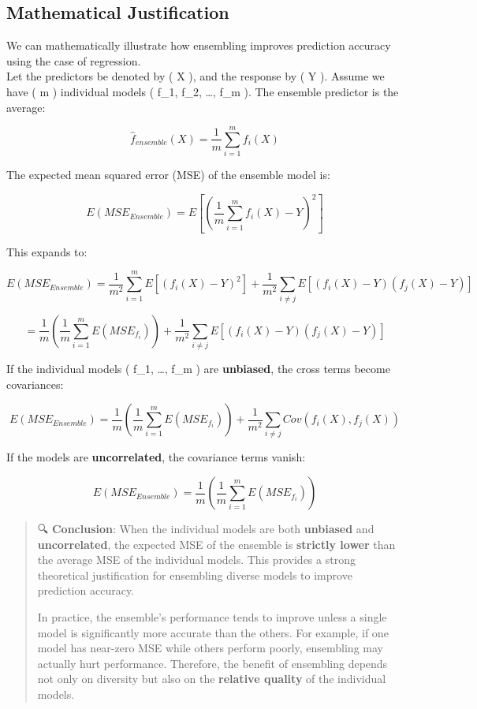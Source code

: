 \documentclass[
  letterpaper,
  DIV=11,
  numbers=noendperiod]{scrreprt}
\begin{document}
\subsection{Mathematical
Justification}\label{mathematical-justification}

We can mathematically illustrate how ensembling improves prediction
accuracy using the case of regression.\\
Let the predictors be denoted by ( X ), and the response by ( Y ).
Assume we have ( m ) individual models ( f\_1, f\_2, \dots, f\_m ). The
ensemble predictor is the average:

\[
\hat{f}_{ensemble}(X) = \frac{1}{m} \sum_{i=1}^{m} f_i(X)
\]

The expected mean squared error (MSE) of the ensemble model is:

\[
E(MSE_{Ensemble}) = E\left[\left( \frac{1}{m} \sum_{i = 1}^{m} f_i(X) - Y \right)^2 \right]
\]

This expands to:

\[
E(MSE_{Ensemble}) = \frac{1}{m^2} \sum_{i = 1}^{m} E\left[(f_i(X) - Y)^2 \right] + \frac{1}{m^2} \sum_{i \ne j} E\left[(f_i(X) - Y)(f_j(X) - Y) \right]
\]

\[
= \frac{1}{m} \left( \frac{1}{m} \sum_{i=1}^m E(MSE_{f_i}) \right) + \frac{1}{m^2} \sum_{i \ne j} E\left[(f_i(X) - Y)(f_j(X) - Y) \right]
\]

If the individual models ( f\_1, \dots, f\_m ) are \textbf{unbiased},
the cross terms become covariances:

\[
E(MSE_{Ensemble}) = \frac{1}{m} \left( \frac{1}{m} \sum_{i=1}^m E(MSE_{f_i}) \right) + \frac{1}{m^2} \sum_{i \ne j} Cov(f_i(X), f_j(X))
\]

If the models are \textbf{uncorrelated}, the covariance terms vanish:

\[
E(MSE_{Ensemble}) = \frac{1}{m} \left( \frac{1}{m} \sum_{i=1}^m E(MSE_{f_i}) \right)
\]

\begin{quote}
🔍 \textbf{Conclusion}: When the individual models are both
\textbf{unbiased} and \textbf{uncorrelated}, the expected MSE of the
ensemble is \textbf{strictly lower} than the average MSE of the
individual models. This provides a strong theoretical justification for
ensembling diverse models to improve prediction accuracy.

In practice, the ensemble's performance tends to improve unless a single
model is significantly more accurate than the others. For example, if
one model has near-zero MSE while others perform poorly, ensembling may
actually hurt performance. Therefore, the benefit of ensembling depends
not only on diversity but also on the \textbf{relative quality} of the
individual models.
\end{quote}
\end{document}
